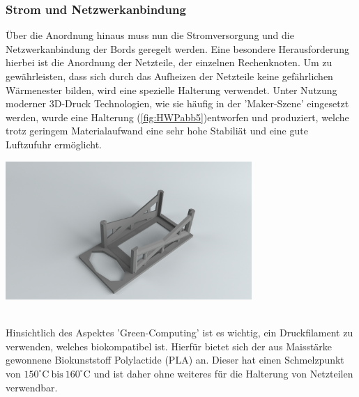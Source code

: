\subsubsection{Strom und Netzwerkanbindung}
Über die Anordnung hinaus muss nun die Stromversorgung und die Netzwerkanbindung
der Bords geregelt werden. Eine besondere Herausforderung hierbei ist die 
Anordnung der Netzteile, der einzelnen Rechenknoten. 
Um zu gewährleisten, dass sich durch das Aufheizen der Netzteile keine gefährlichen
Wärmenester bilden, wird eine spezielle Halterung verwendet.
Unter Nutzung moderner 3D-Druck Technologien, wie sie häufig in der 'Maker-Szene' eingesetzt werden,
wurde eine Halterung (\ref{fig:HWPabb5})entworfen und produziert, welche trotz geringem Materialaufwand eine sehr hohe Stabiliät 
und eine gute Luftzufuhr ermöglicht.~\\
\begin{minipage}{\textwidth}
\begin{center}
	\includegraphics[width=0.7\textwidth]{./Bilder/Server-Aufbau/RenderPowerSupplyBox30.png}
	\label{fig:HWPabb5}

\end{center}	
\end{minipage}
~\\

Hinsichtlich des Aspektes 'Green-Computing' ist es wichtig, ein Druckfilament zu verwenden, 
welches biokompatibel ist. Hierfür bietet sich der aus Maisstärke gewonnene Biokunststoff Polylactide (PLA) an.
Dieser hat einen Schmelzpunkt von $150^\circ\text{C}~\text{bis}~160^\circ \text{C}$
und ist daher ohne weiteres für die Halterung von Netzteilen verwendbar.



